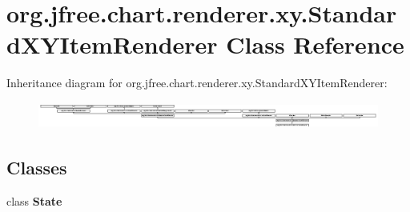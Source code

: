 \hypertarget{classorg_1_1jfree_1_1chart_1_1renderer_1_1xy_1_1_standard_x_y_item_renderer}{}\section{org.\+jfree.\+chart.\+renderer.\+xy.\+Standard\+X\+Y\+Item\+Renderer Class Reference}
\label{classorg_1_1jfree_1_1chart_1_1renderer_1_1xy_1_1_standard_x_y_item_renderer}
Inheritance diagram for org.\+jfree.\+chart.\+renderer.\+xy.\+Standard\+X\+Y\+Item\+Renderer\+:\begin{figure}[H]
\begin{center}
\leavevmode
\includegraphics[height=0.872274cm]{classorg_1_1jfree_1_1chart_1_1renderer_1_1xy_1_1_standard_x_y_item_renderer}
\end{center}
\end{figure}
\subsection*{Classes}
\begin{DoxyCompactItemize}
\item 
class {\bfseries State}
\end{DoxyCompactItemize}
